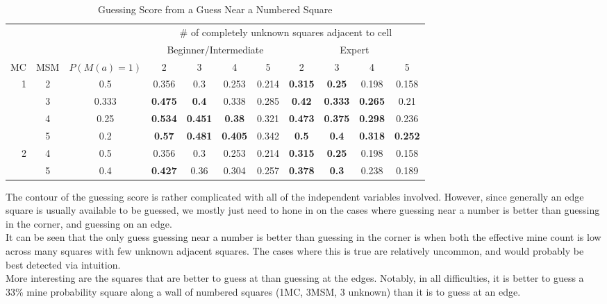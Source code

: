 \begin{table}[h]
    \centering
    \begin{tabular}{|r|c|c|c|c|c|c|c|c|c|c|}\hline
        & & & \multicolumn{8}{c|}{\# of completely unknown squares adjacent to cell}\\
        & & & \multicolumn{4}{c|}{Beginner/Intermediate} & \multicolumn{4}{c|}{Expert}\\
        MC & MSM & $P(M(a)=1)$ & 2 & 3 & 4 & 5 & 2 & 3 & 4 & 5\\\hline
        \multirow{4}{*}{1} & 2 & 0.5 & 0.356 & 0.3 & 0.253 & 0.214 & \textbf{0.315} & \textbf{0.25} & 0.198 & 0.158\\
        & 3 & 0.333 & \textbf{0.475} & \textbf{0.4} & 0.338 & 0.285 & \textbf{0.42} & \textbf{0.333} & \textbf{0.265} & 0.21\\
        & 4 & 0.25 & \textbf{0.534} & \textbf{0.451} & \textbf{0.38} & 0.321 & \textbf{0.473} & \textbf{0.375} & \textbf{0.298} & 0.236\\
        & 5 & 0.2 & \textbf{0.57} & \textbf{0.481} & \textbf{0.405} & 0.342 & \textbf{0.5} & \textbf{0.4} & \textbf{0.318} & \textbf{0.252}\\\hline
        \multirow{3}{*}{2} & 4 & 0.5 & 0.356 & 0.3 & 0.253 & 0.214 & \textbf{0.315} & \textbf{0.25} & 0.198 & 0.158\\
        & 5 & 0.4 & \textbf{0.427} & 0.36 & 0.304 & 0.257 & \textbf{0.378} & \textbf{0.3} & 0.238 & 0.189\\\hline
    \end{tabular}
    \caption{Guessing Score from a Guess Near a Numbered Square}
    \label{tab:ssnp_gs}
\end{table}

The contour of the guessing score is rather complicated with all of the independent variables involved. However, since generally an edge square is usually available to be guessed, we mostly just need to hone in on the cases where guessing near a number is better than guessing in the corner, and guessing on an edge.\\ 

It can be seen that the only guess guessing near a number is better than guessing in the corner is when both the effective mine count is low across many squares with few unknown adjacent squares. The cases where this is true are relatively uncommon, and would probably be best detected via intuition.\\

More interesting are the squares that are better to guess at than guessing at the edges. Notably, in all difficulties, it is better to guess a 33\% mine probability square along a wall of numbered squares (1MC, 3MSM, 3 unknown) than it is to guess at an edge.\\

